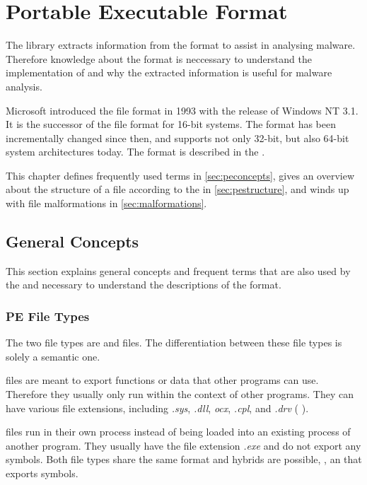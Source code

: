 \chapter{Portable Executable Format} \label{chap:peformat}

The library \portex{} extracts information from the \PE{} format to assist in analysing malware. Therefore knowledge about the \PE{} format is neccessary to understand the implementation of \portex{} and why the extracted information is useful for malware analysis. 

Microsoft introduced the \PE{} file format in 1993 with the release of Windows NT 3.1. It is the successor of the \NZ{} file format for 16-bit systems. The \PE{} format has been incrementally changed since then, and supports not only 32-bit, but also 64-bit system architectures today. The \PE{} format is described in the \PECOFF{} \cite{pespec}. 

This chapter defines frequently used terms in \autoref{sec:peconcepts}, gives an overview about the structure of a \PE{} file according to the \PECOFF{} in \autoref{sec:pestructure}, and winds up with \PE{} file malformations in \autoref{sec:malformations}.

\section{General Concepts}\label{sec:peconcepts}

This section explains general concepts and frequent terms that are also used by the \PECOFF{} and necessary to understand the descriptions of the \PE{} format.

\subsection*{PE File Types}

The two \PE{} file types are \DLL{} and \EXE{} files. The differentiation between these file types is solely a semantic one. 

\DLL{} files are meant to export functions or data that other programs can use. Therefore they usually only run within the context of other programs. They can have various file extensions, including \emph{.sys}, \emph{.dll}, \emph{ocx}, \emph{.cpl}, and \emph{.drv} (\cf{} \cite{micrdll}). 

\EXE{} files run in their own process instead of being loaded into an existing process of another program. They usually have the file extension \emph{.exe} and do not export any symbols. Both file types share the same format and hybrids are possible, \eg{}, an \EXE{} that exports symbols.

